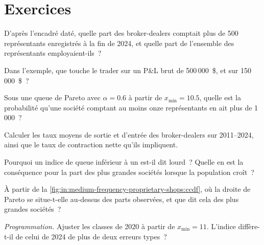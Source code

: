 \section{Exercices}

\begin{exercise}[$\star$]\label{exo:in:medium-frequency-proprietary-shops:1}
D'après l'encadré daté, quelle part des broker-dealers comptait plus de 500 représentants enregistrés à la fin de 2024, et
quelle part de l'ensemble des représentants employaient-ils~?
\end{exercise}

\begin{exercise}[$\star$]\label{exo:in:medium-frequency-proprietary-shops:2}
Dans l'exemple, que touche le trader sur un P\&L brut de 500\,000~\$, et sur 150\,000~\$~?
\end{exercise}

\begin{exercise}[$\star$]\label{exo:in:medium-frequency-proprietary-shops:3}
Sous une queue de Pareto avec $\alpha=0.6$ à partir de $x_{\min}=10.5$, quelle est la probabilité qu'une société comptant au moins onze
représentants en ait plus de 1\,000~?
\end{exercise}

\begin{exercise}[$\star\star$]\label{exo:in:medium-frequency-proprietary-shops:4}
Calculer les taux moyens de sortie et d'entrée des broker-dealers sur 2011--2024, ainsi que le taux de contraction nette qu'ils impliquent.
\end{exercise}

\begin{exercise}[$\star\star$]\label{exo:in:medium-frequency-proprietary-shops:5}
Pourquoi un indice de queue inférieur à un est-il dit lourd~? Quelle en est la conséquence pour la part des plus grandes
sociétés lorsque la population croît~?
\end{exercise}

\begin{exercise}[$\star\star$]\label{exo:in:medium-frequency-proprietary-shops:6}
À partir de la \cref{fig:in:medium-frequency-proprietary-shops:ccdf}, où la droite de Pareto se situe-t-elle au-dessus des parts observées,
et que dit cela des plus grandes sociétés~?
\end{exercise}

\begin{exercise}[$\star\star\star$]\label{exo:in:medium-frequency-proprietary-shops:7}
\emph{Programmation.} Ajuster les classes de 2020 à partir de $x_{\min}=11$. L'indice diffère-t-il de celui de 2024 de plus de deux erreurs types~?
\end{exercise}

